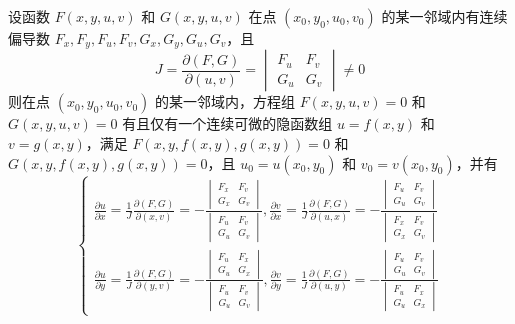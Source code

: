 \begin{theorem}[雅可比行列式]
    设函数 $F(x,y,u,v)$ 和 $G(x,y,u,v)$ 在点 $(x_0,y_0,u_0,v_0)$ 的某一邻域内有连续偏导数 $F_{x},F_{y},F_{u},F_{v},G_{x},G_{y},G_{u},G_{v}$，且
    \begin{equation}
        J= \frac{\partial(F,G)}{\partial(u,v)}=\begin{vmatrix}
            F_{u} & F_{v} \\
            G_{u} & G_{v}
        \end{vmatrix}\neq 0
    \end{equation}
    则在点 $(x_0,y_0,u_0,v_0)$ 的某一邻域内，方程组 $F(x,y,u,v)=0$ 和 $G(x,y,u,v)=0$ 有且仅有一个连续可微的隐函数组 $u=f(x,y)$ 和 $v=g(x,y)$，满足 $F(x,y,f(x,y),g(x,y))=0$ 和 $G(x,y,f(x,y),g(x,y))=0$，且 $u_0=u(x_0,y_0)$ 和 $v_0=v(x_0,y_0)$，并有
    \begin{equation}
        \begin{cases}
            \frac{\partial u}{\partial x}=\frac{1}{J}\frac{\partial(F,G)}{\partial(x,v)}=-\frac{\begin{vmatrix} F_{x} & F_{v} \\ G_{x} & G_{v} \end{vmatrix}}{\begin{vmatrix} F_{u} & F_{v} \\ G_{u} & G_{v} \end{vmatrix}} , \frac{\partial v}{\partial x}=\frac{1}{J}\frac{\partial(F,G)}{\partial(u,x)}=-\frac{\begin{vmatrix} F_{u} & F_{v} \\ G_{u} & G_{v} \end{vmatrix}}{\begin{vmatrix} F_{x} & F_{v} \\ G_{x} & G_{v} \end{vmatrix}} \\
            \frac{\partial u}{\partial y}=\frac{1}{J}\frac{\partial(F,G)}{\partial(y,v)}=-\frac{\begin{vmatrix} F_{u} & F_{x} \\ G_{u} & G_{x} \end{vmatrix}}{\begin{vmatrix} F_{u} & F_{v} \\ G_{u} & G_{v} \end{vmatrix}} , \frac{\partial v}{\partial y}=\frac{1}{J}\frac{\partial(F,G)}{\partial(u,y)}=-\frac{\begin{vmatrix} F_{u} & F_{v} \\ G_{u} & G_{v} \end{vmatrix}}{\begin{vmatrix} F_{u} & F_{x} \\ G_{u} & G_{x} \end{vmatrix}}
        \end{cases}
    \end{equation}
\end{theorem}

